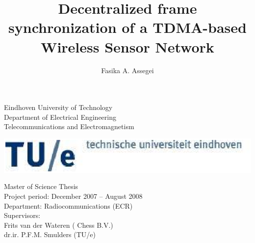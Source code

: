 \documentclass[a4paper,10pt]{report}
\title{\textbf{Decentralized frame synchronization of a TDMA-based Wireless Sensor Network}}
\author{Fasika A. Assegei}
\begin{document}
\pagestyle{empty}
\begin{titlepage}
\begin{center}
\parbox{27cm}{
  \hspace{1cm}
  \begin{minipage}[c]{.6\textwidth}
    Eindhoven University of Technology\\
    Department of Electrical Engineering\\
    Telecommunications and Electromagnetism
  \end{minipage}
   \begin{minipage}[c]{.4\textwidth}
    \includegraphics[scale=0.5]{TUElogoCompact2}
  \end{minipage}
}
\end{center}
%
\begin{center}
\hspace{2cm}
\begin{minipage}[c]{17cm}
    \vspace{3.5cm}
    \centering
    \Large
    \maketitle
\end{minipage}
\end{center}
\hspace{1cm}
\begin{minipage}[b]{15cm}
    Master of Science Thesis\\
    Project period: December 2007 -- August 2008\\
    Department: Radiocommunications (ECR)\\
    Supervisors:\\
    Frits van der Wateren ( Chess B.V.) \\
    dr.ir. P.F.M. Smulders (TU/e) \\
\end{minipage}
\end{titlepage}
\end{document}
